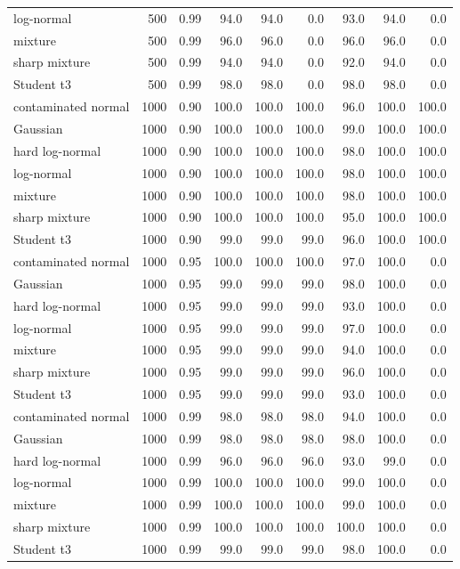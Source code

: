 \begin{longtable}{@{}p{}rrrrrrrr@{}}
\\
log-normal & 500 & 0.99 & 94.0 & 94.0 & 0.0 & 93.0 & 94.0 & 0.0
\\
mixture & 500 & 0.99 & 96.0 & 96.0 & 0.0 & 96.0 & 96.0 & 0.0
\\
sharp mixture & 500 & 0.99 & 94.0 & 94.0 & 0.0 & 92.0 & 94.0 & 0.0
\\
Student t3 & 500 & 0.99 & 98.0 & 98.0 & 0.0 & 98.0 & 98.0 & 0.0
\\
contaminated normal & 1000 & 0.90 & 100.0 & 100.0 & 100.0 & 96.0 & 100.0 & 100.0
\\
Gaussian & 1000 & 0.90 & 100.0 & 100.0 & 100.0 & 99.0 & 100.0 & 100.0
\\
hard log-normal & 1000 & 0.90 & 100.0 & 100.0 & 100.0 & 98.0 & 100.0 & 100.0
\\
log-normal & 1000 & 0.90 & 100.0 & 100.0 & 100.0 & 98.0 & 100.0 & 100.0
\\
mixture & 1000 & 0.90 & 100.0 & 100.0 & 100.0 & 98.0 & 100.0 & 100.0
\\
sharp mixture & 1000 & 0.90 & 100.0 & 100.0 & 100.0 & 95.0 & 100.0 & 100.0
\\
Student t3 & 1000 & 0.90 & 99.0 & 99.0 & 99.0 & 96.0 & 100.0 & 100.0
\\
contaminated normal & 1000 & 0.95 & 100.0 & 100.0 & 100.0 & 97.0 & 100.0 & 0.0
\\
Gaussian & 1000 & 0.95 & 99.0 & 99.0 & 99.0 & 98.0 & 100.0 & 0.0
\\
hard log-normal & 1000 & 0.95 & 99.0 & 99.0 & 99.0 & 93.0 & 100.0 & 0.0
\\
log-normal & 1000 & 0.95 & 99.0 & 99.0 & 99.0 & 97.0 & 100.0 & 0.0
\\
mixture & 1000 & 0.95 & 99.0 & 99.0 & 99.0 & 94.0 & 100.0 & 0.0
\\
sharp mixture & 1000 & 0.95 & 99.0 & 99.0 & 99.0 & 96.0 & 100.0 & 0.0
\\
Student t3 & 1000 & 0.95 & 99.0 & 99.0 & 99.0 & 93.0 & 100.0 & 0.0
\\
contaminated normal & 1000 & 0.99 & 98.0 & 98.0 & 98.0 & 94.0 & 100.0 & 0.0
\\
Gaussian & 1000 & 0.99 & 98.0 & 98.0 & 98.0 & 98.0 & 100.0 & 0.0
\\
hard log-normal & 1000 & 0.99 & 96.0 & 96.0 & 96.0 & 93.0 & 99.0 & 0.0
\\
log-normal & 1000 & 0.99 & 100.0 & 100.0 & 100.0 & 99.0 & 100.0 & 0.0
\\
mixture & 1000 & 0.99 & 100.0 & 100.0 & 100.0 & 99.0 & 100.0 & 0.0
\\
sharp mixture & 1000 & 0.99 & 100.0 & 100.0 & 100.0 & 100.0 & 100.0 & 0.0
\\
Student t3 & 1000 & 0.99 & 99.0 & 99.0 & 99.0 & 98.0 & 100.0 & 0.0
\\
\bottomrule
\end{longtable}
